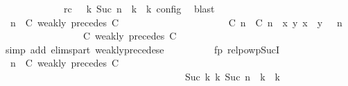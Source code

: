 \begin{isabellebody}
\ \ \ \ \ \ \ \ \ \ \ \ \ rc{\isacharcolon}{\isacartoucheopen}{\isasymrho}\ {\isasymin}\ {\isasymlbrakk}\ {\isasymGamma}\isactrlsub k{\isacharcomma}\ Suc\ n\ {\isasymturnstile}\ {\isasymPsi}\isactrlsub k\ {\isasymtriangleright}\ {\isasymPhi}\isactrlsub k\ {\isasymrbrakk}\isactrlsub c\isactrlsub o\isactrlsub n\isactrlsub f\isactrlsub i\isactrlsub g{\isacartoucheclose}\ \isamarkupfalse%
\ blast\isanewline
\ \ \ \ \ \ \ \ \isamarkupfalse%
\ {\isacartoucheopen}{\isacharparenleft}{\isasymGamma}{\isacharcomma}\ n\ {\isasymturnstile}\ {\isacharparenleft}{\isacharparenleft}C\ weakly\ precedes\ C\ {\isacharhash}\ {\isasymPsi}{\isacharparenright}\ {\isasymtriangleright}\ {\isasymPhi}{\isacharparenright}\isanewline
\ \ \ \ \ \ \ \ \ \ \ \ \ \ \ \ {\isasymhookrightarrow}\ {\isacharparenleft}{\isacharparenleft}{\isacharparenleft}{\isasymlceil}{\isacharhash}\isactrlsup {\isasymle}\ C\ n{\isacharcomma}\ {\isacharhash}\isactrlsup {\isasymle}\ C\ n{\isasymrceil}\ {\isasymin}\ {\isacharparenleft}{\isasymlambda}{\isacharparenleft}x{\isacharcomma}\ y{\isacharparenright}{\isachardot}\ x\ {\isasymle}\ y{\isacharparenright}{\isacharparenright}\ {\isacharhash}\ {\isasymGamma}{\isacharparenright}{\isacharcomma}\ n\isanewline
\ \ \ \ \ \ \ \ \ \ \ \ \ \ {\isasymturnstile}\ {\isasymPsi}\ {\isasymtriangleright}\ {\isacharparenleft}{\isacharparenleft}C\ weakly\ precedes\ C\ {\isacharhash}\ {\isasymPhi}{\isacharparenright}{\isacharparenright}{\isacartoucheclose}\isanewline
\ \ \ \ \ \ \ \ \ \ \isamarkupfalse%
\ {\isacharparenleft}simp\ add{\isacharcolon}\ elims{\isacharunderscore}part\ weakly{\isacharunderscore}precedes{\isacharunderscore}e{\isacharparenright}\isanewline
\ \ \ \ \ \ \ \ \isamarkupfalse%
\ fp\ relpowp{\isacharunderscore}Suc{\isacharunderscore}I{}\ \isamarkupfalse%
\ {\isacartoucheopen}{\isacharparenleft}{\isasymGamma}{\isacharcomma}\ n\ {\isasymturnstile}\ {\isacharparenleft}{\isacharparenleft}C\ weakly\ precedes\ C\ {\isacharhash}\ {\isasymPsi}{\isacharparenright}\ {\isasymtriangleright}\ {\isasymPhi}{\isacharparenright}\isanewline
\ \ \ \ \ \ \ \ \ \ \ \ \ \ \ \ \ \ \ \ \ \ \ \ \ \ \ \ \ \ \ \ \ \ \ \ \ \ {\isasymhookrightarrow}\isactrlbsup Suc\ k\isactrlesup \ {\isacharparenleft}{\isasymGamma}\isactrlsub k{\isacharcomma}\ Suc\ n\ {\isasymturnstile}\ {\isasymPsi}\isactrlsub k\ {\isasymtriangleright}\ {\isasymPhi}\isactrlsub k{\isacharparenright}{\isacartoucheclose}\isanewline

\end{isabellebody}
